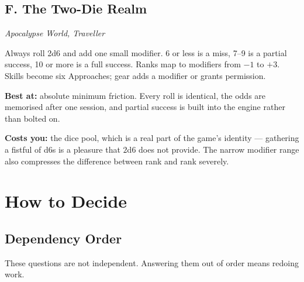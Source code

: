 \documentclass[11pt,oneside]{memoir}
\newcommand{\src}[1]{{\small\itshape\color{atrAccent2}#1}}
\begin{document}
\section{F. The Two-Die Realm}
\src{Apocalypse World, Traveller}

Always roll 2d6 and add one small modifier. 6 or less is a miss, 7--9 is a
partial success, 10 or more is a full success. Ranks map to modifiers from
$-1$ to $+3$. Skills become six Approaches; gear adds a modifier or grants
permission.

\textbf{Best at:} absolute minimum friction. Every roll is identical, the
odds are memorised after one session, and partial success is built into
the engine rather than bolted on.

\textbf{Costs you:} the dice pool, which is a real part of the game's
identity --- gathering a fistful of d6s is a pleasure that $2$d$6$ does not
provide. The narrow modifier range also compresses the difference between
rank  and rank  severely.

\renewcommand{\realmaccent}{atrAccent}
\chapter{How to Decide}

\section{Dependency Order}

These questions are not independent. Answering them out of order means
redoing work.
\end{document}
